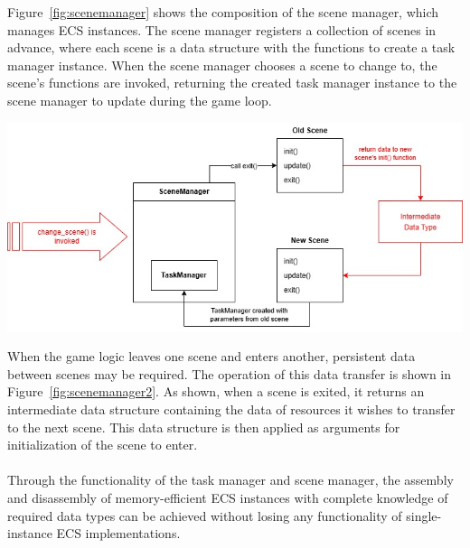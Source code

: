 \vspace{0.5cm}

\noindent Figure~\ref{fig:scenemanager} shows the composition of the scene manager, which manages ECS instances.
The scene manager registers a collection of scenes in advance, where each scene is a data structure with the
functions to create a task manager instance.
When the scene manager chooses a scene to change to, the scene's functions are invoked, returning the created
task manager instance to the scene manager to update during the game loop.

\vspace{0.5cm}

\noindent
\begin{minipage}{\columnwidth}
    \centering
    \includegraphics[width=\columnwidth, keepaspectratio]{images/scenemanager2}
    \label{fig:scenemanager2}
\end{minipage}

\vspace{0.5cm}

\noindent When the game logic leaves one scene and enters another, persistent data between scenes may be required.
The operation of this data transfer is shown in Figure~\ref{fig:scenemanager2}.
As shown, when a scene is exited, it returns an intermediate data structure containing the data of resources
it wishes to transfer to the next scene.
This data structure is then applied as arguments for initialization of the scene to enter.
\\\\
Through the functionality of the task manager and scene manager, the assembly and disassembly of memory-efficient
ECS instances with complete knowledge of required data types can be achieved without losing any functionality of
single-instance ECS implementations.

